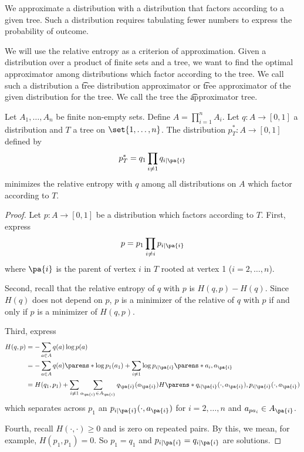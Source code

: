 
We approximate a distribution with a distribution that factors according to a given tree.
Such a distribution requires tabulating fewer numbers to express the probability of outcome.


We will use the relative entropy as a criterion of approximation.
Given a distribution over a product of finite sets and a tree, we want to find the optimal approximator among distributions which factor according to the tree.
We call such a distribution a \t{tree distribution approximator} or \t{tree approximator} of the given distribution for the tree.
We call the tree the \t{approximator tree}.


\begin{prop}

Let $A_1, \dots, A_n$ be finite non-empty sets.
Define $A = \prod_{i = 1}^{n} A_i$.
Let $q: A \to [0, 1]$ a distribution and $T$ a tree on $\set{1, \dots, n}$.
The distribution $p^*_T: A \to [0, 1]$ defined by
$$
  p^*_T = q_1 \prod_{i \neq 1} q_{i \mid \pa{i}}
$$
minimizes the relative entropy with $q$ among all distributions on $A$ which factor according to $T$.

\begin{proof}

Let $p: A \to [0, 1]$ be a distribution which factors according to $T$.
First, express
$$
  p = p_1 \prod_{i \neq i} p_{i \mid \pa{i}}
$$
where $\pa{i}$ is the parent of vertex $i$ in $T$ rooted at vertex 1 ($i = 2, \dots, n$).

Second, recall that the relative entropy of $q$ with $p$ is $H(q, p) - H(q)$.
Since $H(q)$ does not depend on $p$, $p$ is a minimizer of the relative of $q$ with $p$ if and only if $p$ is a minimizer of $H(q, p)$.

Third, express
$$
\begin{aligned}
  H(q, p) &= - \sum_{a \in A} q(a) \log p(a) \\
          &= - \sum_{a \in A} q(a) \parens*{\log p_1(a_1) + \sum_{i \neq 1} \log p_{i \mid \pa{i}}\parens*{a_i, a_{\pa{i}}}} \\
          &= H(q_1, p_1) + \sum_{i \neq 1} \sum_{a_{\pa{i}} \in A_{\pa{i}}} q_{\pa{i}}(a_{\pa{i}})H\parens*{q_{i\mid\pa{i}}(\cdot, a_{\pa{i}}), p_{i\mid\pa{i}}(\cdot, a_{\pa{i}})}
\end{aligned}
$$
which separates across $p_1$ an $p_{i \mid \pa{i}}(\cdot, a_{\pa{i}})$ for $i = 2, \dots, n$ and $a_{pa_{i}} \in A_{\pa{i}}$.

Fourth, recall $H(\cdot, \cdot) \geq 0$ and is zero on repeated pairs.
By this, we mean, for example, $H(p_1, p_1) = 0$.
So $p_1 = q_1$ and $p_{i \mid \pa{i}} = q_{i \mid \pa{i}}$ are solutions.

\end{proof}

\label{prop:treeapproximators}
\end{prop}

